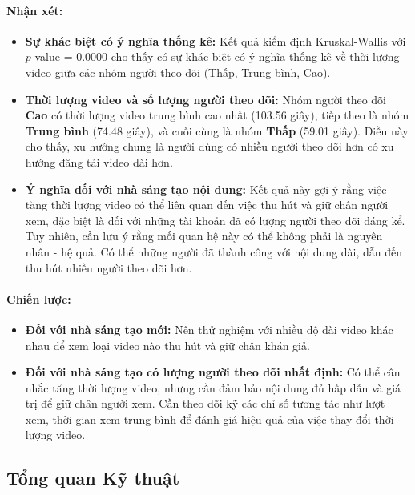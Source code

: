 \paragraph{Nhận xét:}
\begin{itemize}
    \item \textbf{Sự khác biệt có ý nghĩa thống kê:} Kết quả kiểm định Kruskal-Wallis với $p$-value = 0.0000 cho thấy có sự khác biệt có ý nghĩa thống kê về thời lượng video giữa các nhóm người theo dõi (Thấp, Trung bình, Cao).
    
    \item \textbf{Thời lượng video và số lượng người theo dõi:} Nhóm người theo dõi \textbf{Cao} có thời lượng video trung bình cao nhất (103.56 giây), tiếp theo là nhóm \textbf{Trung bình} (74.48 giây), và cuối cùng là nhóm \textbf{Thấp} (59.01 giây). Điều này cho thấy, xu hướng chung là người dùng có nhiều người theo dõi hơn có xu hướng đăng tải video dài hơn.
    
    \item \textbf{Ý nghĩa đối với nhà sáng tạo nội dung:} Kết quả này gợi ý rằng việc tăng thời lượng video có thể liên quan đến việc thu hút và giữ chân người xem, đặc biệt là đối với những tài khoản đã có lượng người theo dõi đáng kể. Tuy nhiên, cần lưu ý rằng mối quan hệ này có thể không phải là nguyên nhân - hệ quả. Có thể những người đã thành công với nội dung dài, dẫn đến thu hút nhiều người theo dõi hơn.
\end{itemize}

\paragraph{Chiến lược:}
\begin{itemize}
    \item \textbf{Đối với nhà sáng tạo mới:} Nên thử nghiệm với nhiều độ dài video khác nhau để xem loại video nào thu hút và giữ chân khán giả.
    
    \item \textbf{Đối với nhà sáng tạo có lượng người theo dõi nhất định:} Có thể cân nhắc tăng thời lượng video, nhưng cần đảm bảo nội dung đủ hấp dẫn và giá trị để giữ chân người xem. Cần theo dõi kỹ các chỉ số tương tác như lượt xem, thời gian xem trung bình để đánh giá hiệu quả của việc thay đổi thời lượng video.
\end{itemize}



\subsection{Tổng quan Kỹ thuật}

